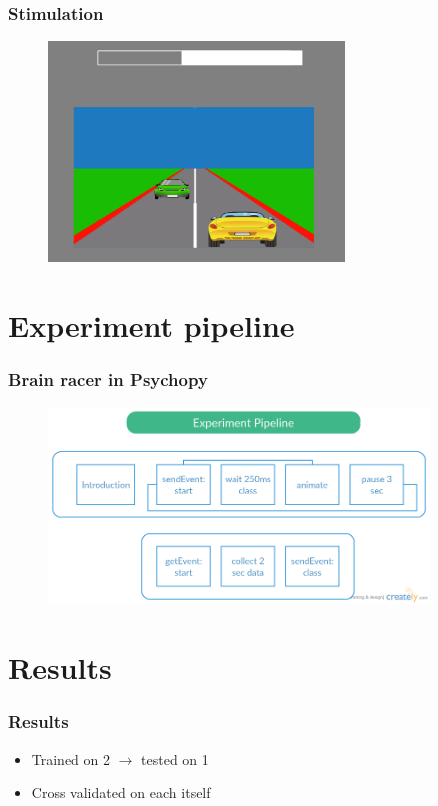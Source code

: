 \documentclass{beamer}
\begin{document}
\begin{frame}
  \frametitle{Stimulation}

  \begin{figure}
    \centering
    \includegraphics[width=0.7\textwidth]{brain_racer.png}
  \end{figure}
\end{frame}

\section{Experiment pipeline}

\begin{frame}
  \frametitle{Brain racer in Psychopy}

  \begin{figure}
    \centering
    \includegraphics[width=0.9\textwidth]{brain_racer_pipeline.png}
  \end{figure}
\end{frame}

\section{Results}

\begin{frame}

\frametitle{Results}
 \begin{itemize}
   \item Trained on 2 $\rightarrow$ tested on 1
   \item Cross validated on each itself
 \end{itemize}

\end{frame}
\end{document}
